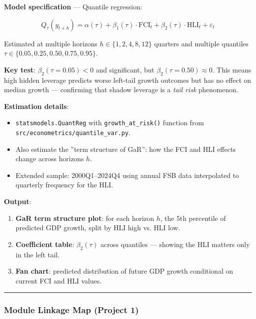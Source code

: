 \documentclass[11pt,a4paper]{article}
\begin{document}
\textbf{Model specification} --- Quantile regression:

\[Q_{\tau}(y_{t+h}) = \alpha(\tau) + \beta_1(\tau) \cdot \text{FCI}_t + \beta_2(\tau) \cdot \text{HLI}_t + \varepsilon_t\]

Estimated at multiple horizons $h \in \{1, 2, 4, 8, 12\}$ quarters and multiple quantiles $\tau \in \{0.05, 0.25, 0.50, 0.75, 0.95\}$.

\textbf{Key test}: $\beta_2(\tau = 0.05) < 0$ and significant, but $\beta_2(\tau = 0.50) \approx 0$. This means high hidden leverage predicts worse left-tail growth outcomes but has no effect on median growth --- confirming that shadow leverage is a \textit{tail risk} phenomenon.

\textbf{Estimation details}:
\begin{itemize}
\item \texttt{statsmodels.QuantReg} with \texttt{growth\_at\_risk()} function from \texttt{src/econometrics/quantile\_var.py}.
\item Also estimate the ''term structure of GaR'': how the FCI and HLI effects change across horizons $h$.
\item Extended sample: 2000Q1--2024Q4 using annual FSB data interpolated to quarterly frequency for the HLI.

\end{itemize}
\textbf{Output}:
\begin{enumerate}
\item \textbf{GaR term structure plot}: for each horizon $h$, the 5th percentile of predicted GDP growth, split by HLI high vs. HLI low.
\item \textbf{Coefficient table}: $\beta_2(\tau)$ across quantiles --- showing the HLI matters only in the left tail.
\item \textbf{Fan chart}: predicted distribution of future GDP growth conditional on current FCI and HLI values.

\end{enumerate}

\bigskip\noindent\rule{\textwidth}{0.4pt}\bigskip


\subsubsection{Module Linkage Map (Project 1)}
\end{document}
